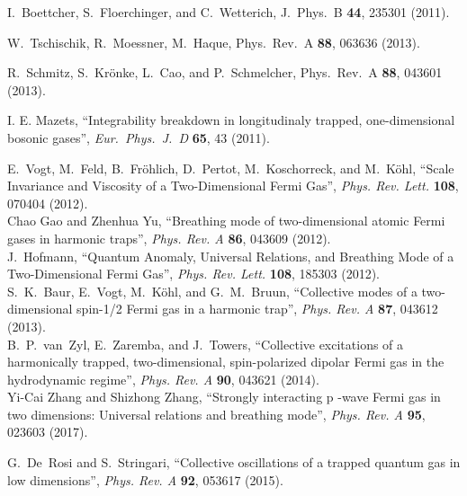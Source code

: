 \documentclass[onecolumn,pra]{revtex4-1}
\begin{document}
\begin{thebibliography}{1}
I.~Boettcher, S.~Floerchinger, and C.~Wetterich, J.~Phys.\ B \textbf{44}, 235301 (2011).


 W.~Tschischik, R.~Moessner, M.~Haque, Phys.\ Rev.~A 
  \textbf{88}, 063636 (2013).

 R.~Schmitz, S.~Kr\"onke, L.~Cao, and 
  P.~Schmelcher, Phys.\ Rev.\ A \textbf{88}, 043601 (2013).

I. E. Mazets, ``Integrability breakdown in longitudinaly trapped, one-dimensional bosonic gases'', 
{\em Eur.~Phys.~J.~D} {\bf 65}, 43 (2011).
  

%

E.~Vogt, M.~Feld, B.~Fr\"ohlich, D.~Pertot, M.~Koschorreck, and M.~K\"ohl, ``Scale Invariance and
Viscosity of a Two-Dimensional Fermi Gas'', {\em Phys. Rev. Lett.} {\bf 108}, 070404 (2012).
%
\\ 
%
Chao Gao and Zhenhua Yu, ``Breathing mode of two-dimensional atomic Fermi gases in harmonic traps'',
{\em Phys. Rev. A} {\bf 86}, 043609 (2012).
%
\\ 
%
J.~Hofmann, ``Quantum Anomaly, Universal Relations, and Breathing Mode of a Two-Dimensional Fermi
Gas'', {\em Phys. Rev. Lett.} {\bf 108}, 185303 (2012).
%
\\ 
%
S.~K.~Baur, E.~Vogt, M.~K\"ohl, and G.~M.~Bruun, ``Collective modes of a two-dimensional spin-1/2
Fermi gas in a harmonic trap'', {\em Phys. Rev. A} {\bf 87}, 043612 (2013).
%
\\ 
%
B.~P.~van~Zyl, E.~Zaremba, and J.~Towers,
``Collective excitations of a harmonically trapped, two-dimensional, spin-polarized dipolar Fermi
gas in the hydrodynamic regime'', 
{\em Phys. Rev. A} {\bf 90}, 043621 (2014). 
%
\\ 
%
Yi-Cai Zhang and Shizhong Zhang, ``Strongly interacting p -wave Fermi gas in two dimensions:
Universal relations and breathing mode'', {\em Phys. Rev. A} {\bf 95}, 023603 (2017).



G.~De~Rosi and S.~Stringari, ``Collective oscillations of a trapped quantum gas in low dimensions'', 
{\em Phys. Rev. A} {\bf 92}, 053617 (2015).


\end{thebibliography}
\end{document}
